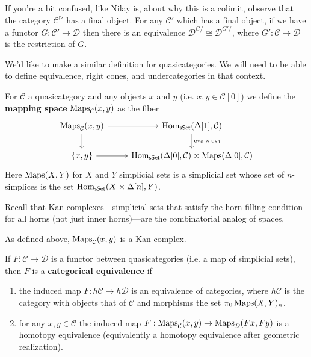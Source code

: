 \documentclass{amsart}
\DeclareMathOperator{\ev}{ev}
\begin{document}
If you're a bit confused, like Nilay is, about why this is a colimit, observe that the category
$\mathcal{C}^\triangleright$ has a final object. 
For any $\mathcal{C}'$ which has a final object, if we have a functor
$G:\mathcal{C}'\to \mathcal{D}$ then there is an equivalence
$\mathcal{D}^{G/}\cong \mathcal{D}^{G'/}$, where $G':\mathcal{C}\to \mathcal{D}$
is the restriction of $G$.

We'd like to make a similar definition for quasicategories. We will need to
be able to define equivalence, right cones, and undercategories in that context.

\begin{definition}
    For $\mathcal{C}$ a quasicategory and any objects $x$ and $y$ (i.e. $x,y\in\mathcal{C}[0]$)
    we define the \textbf{mapping space} $\operatorname{Maps}_\mathcal{C}(x,y)$ as the fiber
    \begin{equation*}
        \begin{tikzcd}
            \Maps_\mathcal{C}(x,y) \dar\rar & \Hom_\mathsf{sSet}(\Delta[1],\mathcal{C})\dar{\ev_0\times\ev_1} \\
            \{x,y\} \rar & \Hom_\mathsf{sSet}(\Delta[0],\mathcal{C})\times\Maps(\Delta[0],\mathcal{C})
        \end{tikzcd}
    \end{equation*}
    Here $\operatorname{Maps}(X,Y)$ for $X$ and $Y$ simplicial sets is a simplicial set
    whose set of $n$-simplices is the set $\operatorname{Hom}_{\mathsf{sSet}}(X\times\Delta[n],Y)$.
\end{definition}

Recall that Kan complexes---simplicial sets that satisfy the horn filling condition
for all horns (not just inner horns)---are the combinatorial analog of spaces.
\begin{lemma}
    As defined above, $\operatorname{Maps}_\mathcal{C}(x,y)$ is a Kan complex.
\end{lemma}

\begin{definition}
    If $F:\mathcal{C}\to \mathcal{D}$ is a functor between quasicategories
    (i.e. a map of simplicial sets), then $F$ is a \textbf{categorical equivalence}
    if
    \begin{enumerate}
        \item the induced map $F:h\mathcal{C}\to h\mathcal{D}$ is an equivalence
            of categories, where $h\mathcal{C}$ is the category with objects that
            of $\mathcal{C}$ and morphisms the set $\pi_0\operatorname{Maps}(X,Y)_n$.
        \item for any $x,y\in\mathcal{C}$ the induced map $F:\operatorname{Maps}_\mathcal{C}(x,y)\to\operatorname{Maps}_\mathcal{D}(Fx,Fy)$
            is a homotopy equivalence (equivalently a homotopy equivalence after
            geometric realization).
    \end{enumerate}
\end{definition}
\end{document}
